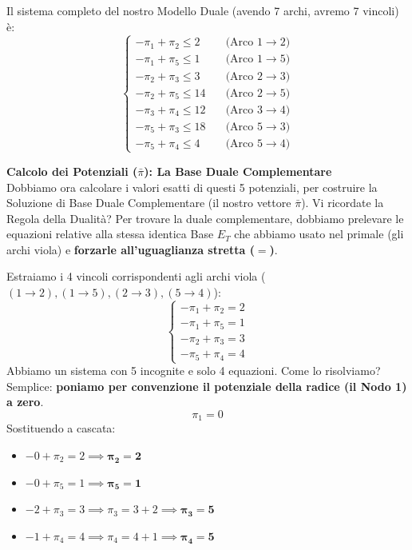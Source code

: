 \documentclass[12pt, a4paper]{article}
\begin{document}
	Il sistema completo del nostro Modello Duale (avendo 7 archi, avremo 7 vincoli) è:
	\[
	\begin{cases}
		-\pi_1 + \pi_2 \leq 2 \quad &\text{(Arco } 1\to2) \\
		-\pi_1 + \pi_5 \leq 1 \quad &\text{(Arco } 1\to5) \\
		-\pi_2 + \pi_3 \leq 3 \quad &\text{(Arco } 2\to3) \\
		-\pi_2 + \pi_5 \leq 14 \quad &\text{(Arco } 2\to5) \\
		-\pi_3 + \pi_4 \leq 12 \quad &\text{(Arco } 3\to4) \\
		-\pi_5 + \pi_3 \leq 18 \quad &\text{(Arco } 5\to3) \\
		-\pi_5 + \pi_4 \leq 4 \quad &\text{(Arco } 5\to4)
	\end{cases}
	\]
	
	\vspace{0.4cm}
	\textbf{Calcolo dei Potenziali ($\bar{\pi}$): La Base Duale Complementare}\\
	Dobbiamo ora calcolare i valori esatti di questi 5 potenziali, per costruire la Soluzione di Base Duale Complementare (il nostro vettore $\bar{\pi}$). 
	Vi ricordate la Regola della Dualità? Per trovare la duale complementare, dobbiamo prelevare le equazioni relative alla stessa identica Base $E_T$ che abbiamo usato nel primale (gli archi viola) e \textbf{forzarle all'uguaglianza stretta ($=$)}.
	
	Estraiamo i 4 vincoli corrispondenti agli archi viola ($(1\to2), (1\to5), (2\to3), (5\to4)$):
	\[
	\begin{cases}
		-\pi_1 + \pi_2 = 2 \\
		-\pi_1 + \pi_5 = 1 \\
		-\pi_2 + \pi_3 = 3 \\
		-\pi_5 + \pi_4 = 4
	\end{cases}
	\]
	Abbiamo un sistema con 5 incognite e solo 4 equazioni. Come lo risolviamo? Semplice: \textbf{poniamo per convenzione il potenziale della radice (il Nodo 1) a zero}.
	\[ \pi_1 = 0 \]
	Sostituendo a cascata:
	\begin{itemize}[label=$\circ$, itemsep=2pt, leftmargin=1.5cm]
		\item $-0 + \pi_2 = 2 \implies \mathbf{\pi_2 = 2}$
		\item $-0 + \pi_5 = 1 \implies \mathbf{\pi_5 = 1}$
		\item $-2 + \pi_3 = 3 \implies \pi_3 = 3 + 2 \implies \mathbf{\pi_3 = 5}$
		\item $-1 + \pi_4 = 4 \implies \pi_4 = 4 + 1 \implies \mathbf{\pi_4 = 5}$
	\end{itemize}
	
\end{document}
